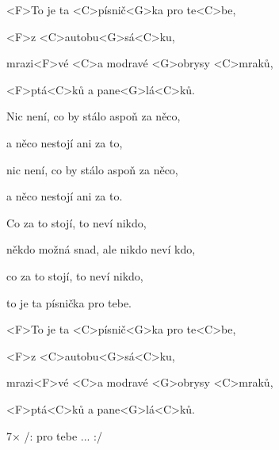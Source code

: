

\zs
<F>To je ta <C>písnič<G>ka pro te<C>be,

<F>z <C>autobu<G>sá<C>ku,

mrazi<F>vé <C>a modravé <G>obrysy <C>mraků,

<F>ptá<C>ků a pane<G>lá<C>ků.
\ks

\zs
Nic není, co by stálo aspoň za něco,

a něco nestojí ani za to,

nic není, co by stálo aspoň za něco,

a něco nestojí ani za to.
\ks

\zs
Co za to stojí, to neví nikdo,

někdo možná snad, ale nikdo neví kdo,

co za to stojí, to neví nikdo,

to je ta písnička pro tebe.
\ks

\zs
<F>To je ta <C>písnič<G>ka pro te<C>be,

<F>z <C>autobu<G>sá<C>ku,

mrazi<F>vé <C>a modravé <G>obrysy <C>mraků,

<F>ptá<C>ků a pane<G>lá<C>ků.
\ks

7× /: pro tebe ... :/

\kp
